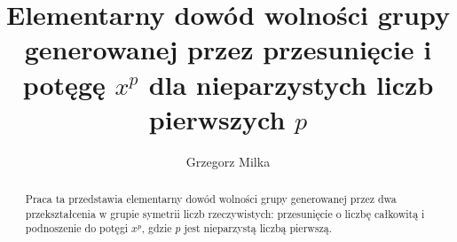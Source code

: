 \documentclass{pracamgr}
\title{Elementarny dowód wolności grupy generowanej przez przesunięcie i
potęgę $x^p$ dla nieparzystych liczb pierwszych $p$}
\author{Grzegorz Milka}
\begin{document}
\maketitle

\begin{abstract}
  Praca ta przedstawia elementarny dowód wolności grupy generowanej przez dwa
  przekształcenia w grupie symetrii liczb rzeczywistych: przesunięcie o liczbę
  całkowitą i podnoszenie do potęgi $x^p$, gdzie $p$ jest nieparzystą liczbą
  pierwszą.
\end{abstract}

\tableofcontents





\end{document}
